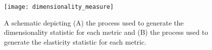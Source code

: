 \begin{figure}
\begin{center}

\texttt{[image: dimensionality\_measure]}
\caption{
A schematic depicting (A) the process used to generate the dimensionality statistic for each metric and (B) the process used to generate the elasticity statistic for each metric.
}
\label{fig:dimensionality_measure}

\end{center}
\end{figure}
